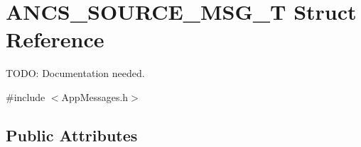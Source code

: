 \hypertarget{struct_a_n_c_s___s_o_u_r_c_e___m_s_g___t}{}\section{A\+N\+C\+S\+\_\+\+S\+O\+U\+R\+C\+E\+\_\+\+M\+S\+G\+\_\+\+T Struct Reference}
\label{struct_a_n_c_s___s_o_u_r_c_e___m_s_g___t}


T\+O\+D\+O\+: Documentation needed.  




{\ttfamily \#include $<$App\+Messages.\+h$>$}

\subsection*{Public Attributes}
